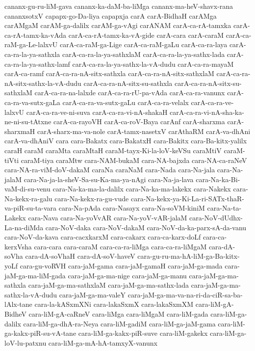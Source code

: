 {cananx-gu-ru-liM-gava
cananx-ka-daM-ba-liMga
cananx-ma-heV-shavx-rana
cananxsotxV
capapx-go-Da-liya
capapxja
carA
carA-BidhaH
carAMga
carAMgaM
carAM-ga-dalilx
carAM-ga-vAgi
carANAM
carA-ca-rA-tamxka
carA-ca-rA-tamx-ka-vAda
carA-ca-rA-tamx-ka-vA-gide
carA-cara
carA-caraM
carA-ca-raM-ga-Le-lalxvU
carA-ca-raM-ga-Lige
carA-ca-raM-gaLu
carA-ca-ra-laya
carA-ca-ra-la-ya-sathxla
carA-ca-ra-la-ya-sathxlaM
carA-ca-ra-la-ya-sathx-lada
carA-ca-ra-la-ya-sathx-lamf
carA-ca-ra-la-ya-sathx-la-vA-dudu
carA-ca-ra-mayaM
carA-ca-ramf
carA-ca-ra-nA-sitx-sathxla
carA-ca-ra-nA-sitx-sathxlaM
carA-ca-ra-nA-sitx-sathx-la-vA-dudu
carA-ca-ra-nA-sitx-su-sathxla
carA-ca-ra-nA-sitx-su-sathxlaM
carA-ca-ra-na-lalxde
carA-ca-ra-rU-pa-vAda
carA-ca-ra-vanunx
carA-ca-ra-va-sutx-gaLa
carA-ca-ra-va-sutx-gaLu
carA-ca-ra-velalx
carA-ca-ra-ve-lalxvU
carA-ca-ra-ve-ni-suva
carA-ca-ra-vi-nA-shakaH
carA-ca-ra-vi-nA-sha-ka-ne-ni-su-tAtxne
carA-ca-rayoVH
carA-ca-roV-Baya
carAnf
carA-sharxma
carA-sharxmaH
carA-sharx-ma-va-nole
carA-tamx-nasetxV
carAthaRM
carA-va-dhAni
carA-va-dhAniV
cara
cara-Bakatx
cara-BakatxH
cara-Bakitx
cara-Ba-kitx-yalilx
caraH
caraM
caraMta
caraMtaH
caraM-tayx-Ki-la-loV-keVSu
caraMtiV
caraM-tiVti
caraM-tiya
caraMtw
cara-NAM-bukaM
cara-NA-bajxda
cara-NA-ca-raNeV
cara-NA-ra-viM-doV-dakaM
caraNa
caraNaM
cara-Nada
cara-Na-jala
cara-Na-jalaM
cara-Na-ja-la-sheV-Sa-su-Ka-ma-ya-nAgi
cara-Na-ja-lava
cara-Na-ka-Bi-vaM-di-su-venu
cara-Na-ka-ma-la-dalilx
cara-Na-ka-ma-lakekx
cara-Nakekx
cara-Na-kekx-ra-galu
cara-Na-kekx-ra-gu-vude
cara-Na-kekx-ya-Ki-La-ri-SATx-thaR-va-piR-su-ta-vara
cara-Na-pAda
cara-Nasayx
cara-Na-soVM-kiniM
cara-Na-ta-Lakekx
cara-Nava
cara-Na-yoVvAR
cara-Na-yoV-vAR-jalaM
cara-NoV-dUdhx-La-na-diMda
cara-NoV-daka
cara-NoV-dakaM
cara-NoV-da-ka-parx-sA-da-vanu
cara-NoV-da-kava
cara-cacxkarxM
cara-cakarx
cara-ca-karx-doLf
cara-ca-kerxVsha
cara-cara
cara-caraM
cara-ca-ra-liMga
cara-ca-ra-liMgaM
cara-dA-soVha
cara-dA-soVhaH
cara-dA-soV-haveV
cara-gu-ru-ma-hA-liM-ga-Ba-kitx-yoLf
cara-gu-voRVH
cara-jaM-gama
cara-jaM-gamaH
cara-jaM-ga-mada
cara-jaM-ga-ma-liM-gada
cara-jaM-ga-ma-nige
cara-jaM-ga-manu
cara-jaM-ga-ma-sathxla
cara-jaM-ga-ma-sathxlaM
cara-jaM-ga-ma-sathx-lada
cara-jaM-ga-ma-sathx-la-vA-dudu
cara-jaM-ga-ma-valeY
cara-jaM-ga-ma-va-na-ri-da-ciR-sa-ba-lAlx-tane
cara-la-kASxmXNi
cara-lakaSxmX
cara-lakaSxmXM
cara-liM-gA-BidheV
cara-liM-gA-caRneV
cara-liMga
cara-liMgaM
cara-liM-gada
cara-liM-ga-dalilx
cara-liM-ga-dhA-ra-Neya
cara-liM-gadiM
cara-liM-ga-jaM-gama
cara-liM-ga-kakx-piR-su-vA-tane
cara-liM-ga-kakx-piR-suve
cara-liM-gakekx
cara-liM-ga-loV-lu-patxnu
cara-liM-ga-mA-hA-tamxyX-vanunx
}

